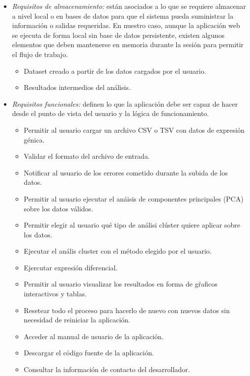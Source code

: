 \begin{itemize}
    \item \textit{Requisitos de almacenamiento: } están asociados a lo que se requiere almacenar a nivel local o en bases de datos para que el sistema
    pueda suministrar la información o salidas requeridas. En nuestro caso, aunque la aplicación web se ejecuta de forma local sin base de datos persistente,
    existen algunos elementos que deben mantenerse en memoria durante la sesión para permitir el flujo de trabajo.
    \begin{itemize}
        \item Dataset creado a partir de los datos cargados por el usuario.
        \item Resultados intermedios del análisis.
    \end{itemize}

    \item \textit{Requisitos funcionales: } definen lo que la aplicación debe ser capaz de hacer desde el punto de vista del usuario y la lógica de funcionamiento.
    \begin{itemize}
        \item Permitir al usuario cargar un archivo CSV o TSV con datos de expresión génica.
        \item Validar el formato del archivo de entrada.
        \item Notificar al usuario de los errores cometido durante la subida de los datos.
        \item Permitir al usuario ejecutar el anáisis de componentes principales (PCA) sobre los datos válidos.
        \item Permitir elegir al usuario qué tipo de análisi clúster quiere aplicar sobre los datos.
        \item Ejecutar el anális cluster con el método elegido por el usuario.
        \item Ejercutar expresión diferencial.
        \item Permitir al usuario visualizar los resultados en forma de gŕaficos interactivos y tablas.
        \item Resetear todo el proceso para hacerlo de nuevo con nuevos datos sin necesidad de reiniciar la aplicación.
        \item Acceder al manual de usuario de la aplicación.
        \item Descargar el código fuente de la aplicación.
        \item Consultar la información de contacto del desarrollador.
    \end{itemize}


\end{itemize}
